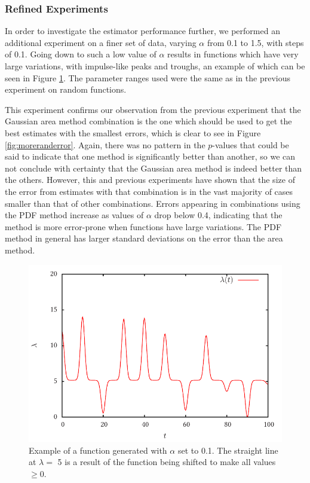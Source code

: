 \documentclass[a4paper,11pt]{article}
\begin{document}
\subsubsection{Refined Experiments}
\label{sec-8-2-2}

In order to investigate the estimator performance further, we performed an
additional experiment on a finer set of data, varying $\alpha$ from 0.1 to 1.5,
with steps of 0.1. Going down to such a low value of $\alpha$ results in
functions which have very large variations, with impulse-like peaks and troughs,
an example of which can be seen in Figure \ref{fig:smallalpha}. The parameter
ranges used were the same as in the previous experiment on random functions.

This experiment confirms our observation from the previous experiment that the
Gaussian area method combination is the one which should be used to get the best
estimates with the smallest errors, which is clear to see in Figure
\ref{fig:moreranderror}. Again, there was no pattern in the $p$-values that
could be said to indicate that one method is significantly better than another,
so we can not conclude with certainty that the Gaussian area method is indeed
better than the others. However, this and previous experiments have shown that
the size of the error from estimates with that combination is in the vast
majority of cases smaller than that of other combinations. Errors appearing in
combinations using the PDF method increase as values of $\alpha$ drop below 0.4,
indicating that the method is more error-prone when functions have large
variations. The PDF method in general has larger standard deviations on the
error than the area method.
\begin{center}
\begin{figure}
\includegraphics{smallalpha}
\caption{Example of a function generated with $\alpha$ set to 0.1. The straight
line at $\lambda=$ 5 is a result of the function being shifted to make all values
$\geq 0$.}
\label{fig:smallalpha}
\end{figure}
\end{center}
\end{document}
